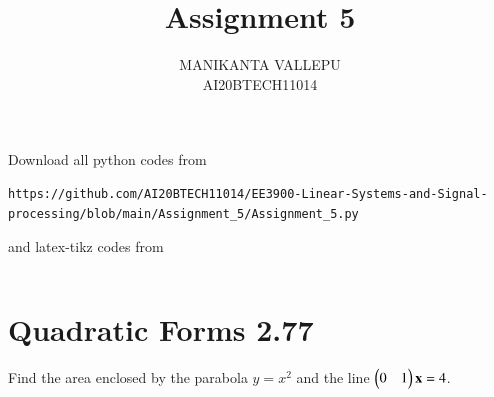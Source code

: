 \documentclass[journal,12pt,twocolumn]{IEEEtran}
\begin{document}
     \def\centbox#1{\makebox[0in]{#1}}
     \def\topbox#1{\raisebox{-\baselineskip}[0in][0in]{#1}}
     \def\midbox#1{\raisebox{-0.5\baselineskip}[0in][0in]{#1}}
\vspace{3cm}
\title{Assignment 5}
\author{MANIKANTA VALLEPU \\ AI20BTECH11014}
\maketitle
\newpage
\bigskip
\renewcommand{\thefigure}{\theenumi}
\renewcommand{\thetable}{\theenumi}
Download all python codes from 
\begin{lstlisting}
https://github.com/AI20BTECH11014/EE3900-Linear-Systems-and-Signal-processing/blob/main/Assignment_5/Assignment_5.py
\end{lstlisting}
%
and latex-tikz codes from 
%
\begin{lstlisting}

\end{lstlisting}
\section{Quadratic Forms 2.77}
Find the area enclosed by the parabola $y = x^2$ and the line $\begin{pmatrix}0& 1\end{pmatrix}\mathbf{x} = 4$.
\end{document}
